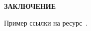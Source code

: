 \newpage
\begin{center}
  \Large{\textbf{ЗАКЛЮЧЕНИЕ}}
\end{center}

Пример ссылки на ресурс~\cite{Spero}.
\newpage

